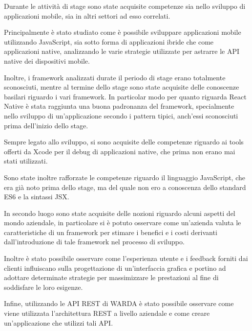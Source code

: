 Durante le attività di stage sono state acquisite competenze sia nello sviluppo di applicazioni mobile, sia in altri settori ad esso correlati.

Principalmente è stato studiato come è possibile sviluppare applicazioni mobile utilizzando JavaScript, sia sotto forma di applicazioni ibride che come applicazioni native, analizzando le varie strategie utilizzate per astrarre le API native dei dispositivi mobile.

Inoltre, i framework analizzati durate il periodo di stage erano totalmente sconosciuti, mentre al termine dello stage sono state acquisite delle conoscenze basilari riguardo i vari framework.
In particolar modo per quanto riguarda React Native è stata raggiunta una buona padronanza del framework, specialmente nello sviluppo di un'applicazione secondo i pattern tipici, anch'essi sconosciuti prima dell'inizio dello stage.

Sempre legato allo sviluppo, si sono acquisite delle competenze riguardo ai tools offerti da Xcode per il debug di applicazioni native, che prima non erano mai stati utilizzati.

Sono state inoltre rafforzate le competenze riguardo il linguaggio JavaScript, che era già noto prima dello stage, ma del quale non ero a conoscenza dello standard ES6 e la sintassi JSX.

In secondo luogo sono state acquisite delle nozioni riguardo alcuni aspetti del mondo aziendale, in particolare si è potuto osservare come un'azienda valuta le caratteristiche di un framework per stimare i benefici e i costi derivanti dall'introduzione di tale framework nel processo di sviluppo.

Inoltre è stato possibile osservare come l'esperienza utente e i feedback forniti dai clienti influiscano sulla progettazione di un'interfaccia grafica e portino ad adottare determinate strategie per massimizzare le prestazioni al fine di soddisfare le loro esigenze.

Infine, utilizzando le API REST di WARDA è stato possibile osservare come viene utilizzata l'architettura REST a livello aziendale e come creare un'applicazione che utilizzi tali API.
